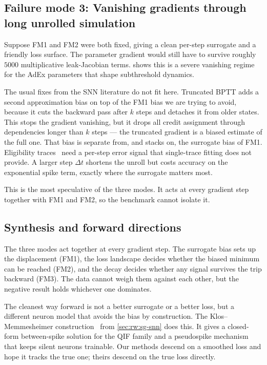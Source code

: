 \subsection{Failure mode 3: Vanishing gradients through long unrolled simulation}\label{sec:discussion:decay}

Suppose FM1 and FM2 were both fixed, giving a clean per-step surrogate and a friendly loss surface.
The parameter gradient would still have to survive roughly $5000$ multiplicative leak-Jacobian terms.
 shows this is a severe vanishing regime for the \gls{AdEx} parameters that shape subthreshold dynamics.

The usual fixes from the \gls{SNN} literature do not fit here.
Truncated \gls{BPTT} adds a second approximation bias on top of the FM1 bias we are trying to avoid, because it cuts the backward pass after $k$ steps and detaches it from older states.
This stops the gradient vanishing, but it drops all credit assignment through dependencies longer than $k$ steps --- the truncated gradient is a biased estimate of the full one.
That bias is separate from, and stacks on, the surrogate bias of FM1.
Eligibility traces~\cite{Bellec2020} need a per-step error signal that single-trace fitting does not provide.
A larger step $\Delta t$ shortens the unroll but costs accuracy on the exponential spike term, exactly where the surrogate matters most.

This is the most speculative of the three modes.
It acts at every gradient step together with FM1 and FM2, so the benchmark cannot isolate it.

\subsection{Synthesis and forward directions}\label{sec:discussion:forward}

The three modes act together at every gradient step.
The surrogate bias sets up the displacement (FM1), the loss landscape decides whether the biased minimum can be reached (FM2), and the decay decides whether any signal survives the trip backward (FM3).
The data cannot weigh them against each other, but the negative result holds whichever one dominates.

The cleanest way forward is not a better surrogate or a better loss, but a different neuron model that avoids the bias by construction.
The Klos--Memmesheimer construction~\cite{Klos2025} from \cref{sec:rw:sg-snn} does this.
It gives a closed-form between-spike solution for the \gls{QIF} family and a pseudospike mechanism that keeps silent neurons trainable.
Our methods descend on a smoothed loss and hope it tracks the true one; theirs descend on the true loss directly.

